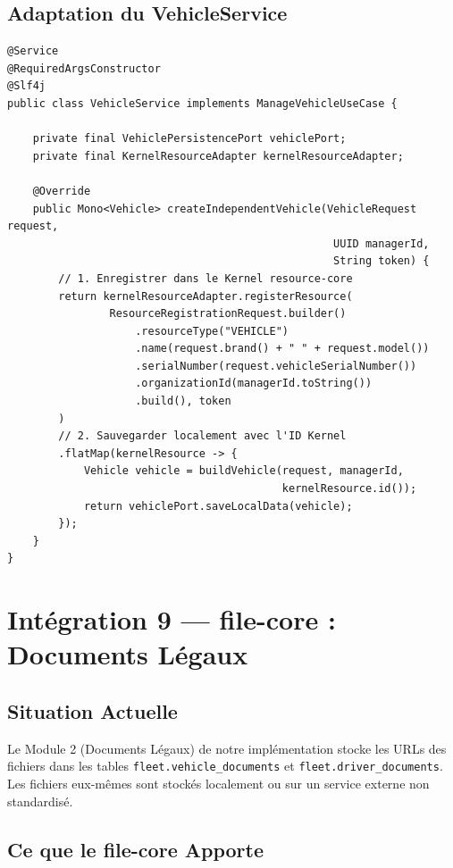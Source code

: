 \documentclass[12pt,a4paper]{report}
\begin{document}
\subsection{Adaptation du VehicleService}

\begin{lstlisting}[style=javaStyle, caption={VehicleService enrichi avec resource-core}]
@Service
@RequiredArgsConstructor
@Slf4j
public class VehicleService implements ManageVehicleUseCase {

    private final VehiclePersistencePort vehiclePort;
    private final KernelResourceAdapter kernelResourceAdapter;

    @Override
    public Mono<Vehicle> createIndependentVehicle(VehicleRequest request,
                                                   UUID managerId,
                                                   String token) {
        // 1. Enregistrer dans le Kernel resource-core
        return kernelResourceAdapter.registerResource(
                ResourceRegistrationRequest.builder()
                    .resourceType("VEHICLE")
                    .name(request.brand() + " " + request.model())
                    .serialNumber(request.vehicleSerialNumber())
                    .organizationId(managerId.toString())
                    .build(), token
        )
        // 2. Sauvegarder localement avec l'ID Kernel
        .flatMap(kernelResource -> {
            Vehicle vehicle = buildVehicle(request, managerId,
                                           kernelResource.id());
            return vehiclePort.saveLocalData(vehicle);
        });
    }
}
\end{lstlisting}

\section{Intégration 9 — file-core : Documents Légaux}

\subsection{Situation Actuelle}

Le Module 2 (Documents Légaux) de notre implémentation stocke les URLs des fichiers dans les tables \texttt{fleet.vehicle\_documents} et \texttt{fleet.driver\_documents}. Les fichiers eux-mêmes sont stockés localement ou sur un service externe non standardisé.

\subsection{Ce que le file-core Apporte}
\end{document}

